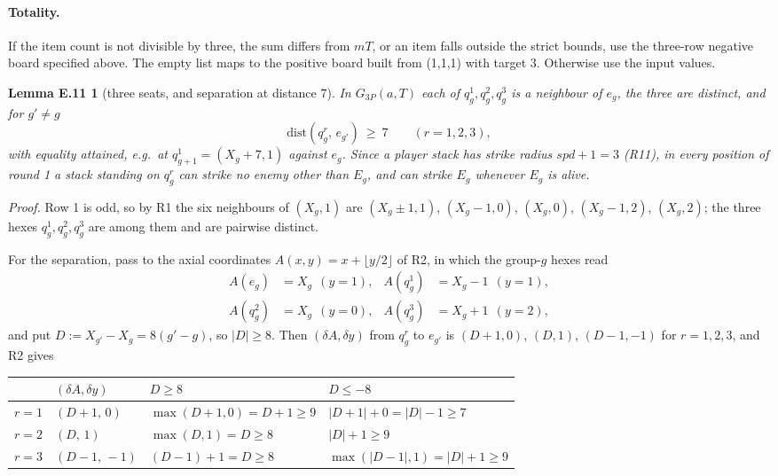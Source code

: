 \documentclass[11pt,a4paper]{article}
\theoremstyle{plain}
\newtheorem*{lemEseptwo}{Lemma E.11}
\theoremstyle{definition}
\theoremstyle{plain}
\theoremstyle{definition}
\theoremstyle{remark}
\begin{document}
\paragraph{Totality.} If the item count is not divisible by three, the sum differs from $mT$, or an item falls outside the strict bounds, use the three-row negative board specified above. The empty list maps to the positive board built from (1,1,1) with target 3. Otherwise use the input values.

\begin{lemEseptwo}[three seats, and separation at distance 7]
In $G_{3P}(a,T)$ each of $q_g^1,q_g^2,q_g^3$ is a neighbour of $e_g$, the three are distinct,
and for $g'\ne g$
\[
  \mathrm{dist}(q_g^r,\,e_{g'})\ \ge\ 7 \qquad (r=1,2,3),
\]
with equality attained, e.g.\ at $q_{g+1}^1=(X_g+7,1)$ against $e_g$. Since a player stack
has strike radius $\mathit{spd}+1=3$ (R11), in \emph{every} position of round 1 a stack
standing on $q_g^r$ can strike no enemy other than $E_g$, and can strike $E_g$ whenever
$E_g$ is alive.
\end{lemEseptwo}

\noindent\emph{Proof.} Row 1 is odd, so by R1 the six neighbours of $(X_g,1)$ are
$(X_g\pm 1,1)$, $(X_g-1,0)$, $(X_g,0)$, $(X_g-1,2)$, $(X_g,2)$; the three hexes
$q_g^1,q_g^2,q_g^3$ are among them and are pairwise distinct.

For the separation, pass to the axial coordinates $A(x,y)=x+\lfloor y/2\rfloor$ of R2, in
which the group-$g$ hexes read
\begin{align*}
  A(e_g)&=X_g\ \ (y=1), & A(q_g^1)&=X_g-1\ \ (y=1),\\
  A(q_g^2)&=X_g\ \ (y=0), & A(q_g^3)&=X_g+1\ \ (y=2),
\end{align*}
and put $D:=X_{g'}-X_g=8(g'-g)$, so $|D|\ge 8$. Then $(\delta A,\delta y)$ from $q_g^r$ to
$e_{g'}$ is $(D+1,0)$, $(D,1)$, $(D-1,-1)$ for $r=1,2,3$, and R2 gives

\begin{center}
\begin{tabular}{@{}llll@{}}
\toprule
 & $(\delta A,\delta y)$ & $D\ge 8$ & $D\le -8$ \\
\midrule
$r=1$ & $(D+1,\,0)$  & $\max(D+1,0)=D+1\ge 9$ & $|D+1|+0=|D|-1\ge 7$ \\
$r=2$ & $(D,\,1)$    & $\max(D,1)=D\ge 8$     & $|D|+1\ge 9$ \\
$r=3$ & $(D-1,\,-1)$ & $(D-1)+1=D\ge 8$       & $\max(|D-1|,1)=|D|+1\ge 9$ \\
\bottomrule
\end{tabular}
\end{center}
\end{document}

